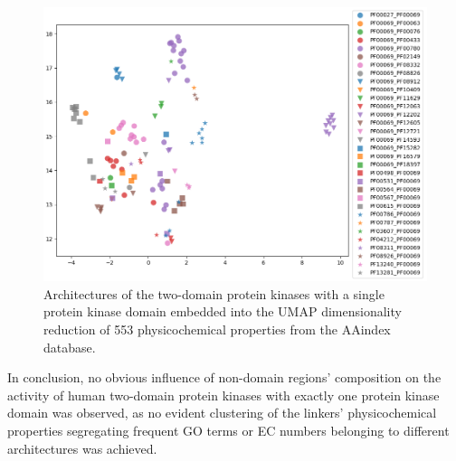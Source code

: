 	\begin{figure}
		\centering
		\includegraphics[width=0.9\linewidth]{img/aa_umap_arch.png}
		\caption{Architectures of the two-domain protein kinases with a single protein kinase
		domain embedded into the UMAP dimensionality reduction of 553 physicochemical
		properties from the AAindex database.}
		\label{fig:aa_umap}
	\end{figure}

	In conclusion, no obvious influence of non-domain regions' composition on the activity
	of human two-domain protein kinases with exactly one protein kinase domain was observed,
	as no evident clustering of the linkers' physicochemical properties segregating frequent
	GO terms or EC numbers belonging to different architectures was achieved.
